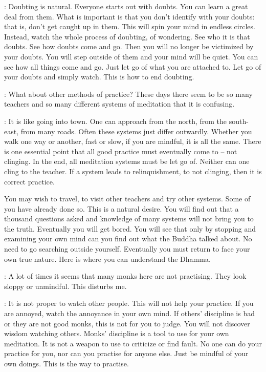 : Doubting is natural. Everyone starts out with doubts. You can learn a great deal from them. What is important is that you don't identify with your doubts: that is, don't get caught up in them. This will spin your mind in endless circles. Instead, watch the whole process of doubting, of wondering. See who it is that doubts. See how doubts come and go. Then you will no longer be victimized by your doubts. You will step outside of them and your mind will be quiet. You can see how all things come and go. Just let go of what you are attached to. Let go of your doubts and simply watch. This is how to end doubting.

:
What about other methods of practice? These days there seem to be so many teachers and so many different systems of meditation that it is confusing.

:
It is like going into town. One can approach from the north, from the south-east, from many roads. Often these systems just differ outwardly. Whether you walk one way or another, fast or slow, if you are mindful, it is all the same. There is one essential point that all good practice must eventually come to -- not clinging. In the end, all meditation systems must be let go of. Neither can one cling to the teacher. If a system leads to relinquishment, to not clinging, then it is correct practice.

You may wish to travel, to visit other teachers and try other systems. Some of you have already done so. This is a natural desire. You will find out that a thousand questions asked and knowledge of many systems will not bring you to the truth. Eventually you will get bored. You will see that only by stopping and examining your own mind can you find out what the Buddha talked about. No need to go searching outside yourself. Eventually you must return to face your own true nature. Here is where you can understand the Dhamma.

:
A lot of times it seems that many monks here are not practising. They look sloppy or unmindful. This disturbs me.

: It is not proper to watch other people. This will not help your practice. If you are annoyed, watch the annoyance in your own mind. If others' discipline is bad or they are not good monks, this is not for you to judge. You will not discover wisdom watching others. Monks' discipline is a tool to use for your own meditation. It is not a weapon to use to criticize or find fault. No one can do your practice for you, nor can you practise for anyone else. Just be mindful of your own doings. This is the way to practise.

